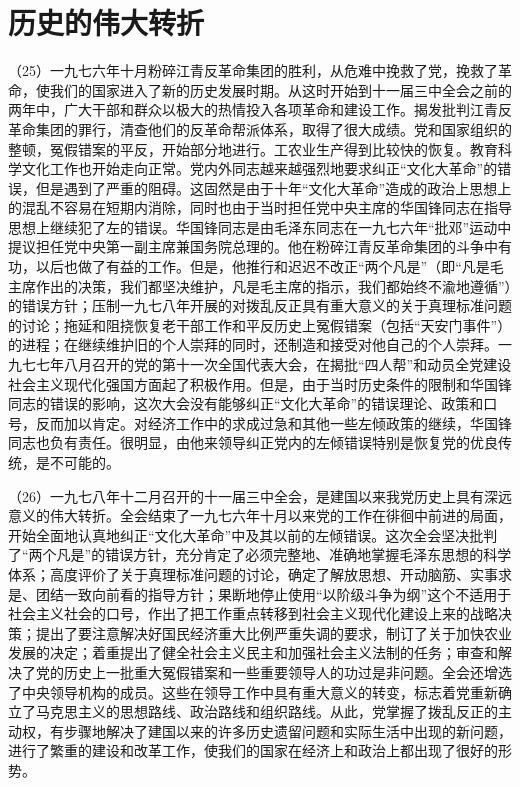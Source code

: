 \section{历史的伟大转折}

（25）一九七六年十月粉碎江青反革命集团的胜利，从危难中挽救了党，挽救了革命，使我们的国家进入了新的历史发展时期。从这时开始到十一届三中全会之前的两年中，广大干部和群众以极大的热情投入各项革命和建设工作。揭发批判江青反革命集团的罪行，清查他们的反革命帮派体系，取得了很大成绩。党和国家组织的整顿，冤假错案的平反，开始部分地进行。工农业生产得到比较快的恢复。教育科学文化工作也开始走向正常。党内外同志越来越强烈地要求纠正“文化大革命”的错误，但是遇到了严重的阻碍。这固然是由于十年“文化大革命”造成的政治上思想上的混乱不容易在短期内消除，同时也由于当时担任党中央主席的华国锋同志在指导思想上继续犯了左的错误。华国锋同志是由毛泽东同志在一九七六年“批邓”运动中提议担任党中央第一副主席兼国务院总理的。他在粉碎江青反革命集团的斗争中有功，以后也做了有益的工作。但是，他推行和迟迟不改正“两个凡是”（即“凡是毛主席作出的决策，我们都坚决维护，凡是毛主席的指示，我们都始终不渝地遵循”）的错误方针；压制一九七八年开展的对拨乱反正具有重大意义的关于真理标准问题的讨论；拖延和阻挠恢复老干部工作和平反历史上冤假错案（包括“天安门事件”）的进程；在继续维护旧的个人崇拜的同时，还制造和接受对他自己的个人崇拜。一九七七年八月召开的党的第十一次全国代表大会，在揭批“四人帮”和动员全党建设社会主义现代化强国方面起了积极作用。但是，由于当时历史条件的限制和华国锋同志的错误的影响，这次大会没有能够纠正“文化大革命”的错误理论、政策和口号，反而加以肯定。对经济工作中的求成过急和其他一些左倾政策的继续，华国锋同志也负有责任。很明显，由他来领导纠正党内的左倾错误特别是恢复党的优良传统，是不可能的。

（26）一九七八年十二月召开的十一届三中全会，是建国以来我党历史上具有深远意义的伟大转折。全会结束了一九七六年十月以来党的工作在徘徊中前进的局面，开始全面地认真地纠正“文化大革命”中及其以前的左倾错误。这次全会坚决批判了“两个凡是”的错误方针，充分肯定了必须完整地、准确地掌握毛泽东思想的科学体系；高度评价了关于真理标准问题的讨论，确定了解放思想、开动脑筋、实事求是、团结一致向前看的指导方针；果断地停止使用“以阶级斗争为纲”这个不适用于社会主义社会的口号，作出了把工作重点转移到社会主义现代化建设上来的战略决策；提出了要注意解决好国民经济重大比例严重失调的要求，制订了关于加快农业发展的决定；着重提出了健全社会主义民主和加强社会主义法制的任务；审查和解决了党的历史上一批重大冤假错案和一些重要领导人的功过是非问题。全会还增选了中央领导机构的成员。这些在领导工作中具有重大意义的转变，标志着党重新确立了马克思主义的思想路线、政治路线和组织路线。从此，党掌握了拨乱反正的主动权，有步骤地解决了建国以来的许多历史遗留问题和实际生活中出现的新问题，进行了繁重的建设和改革工作，使我们的国家在经济上和政治上都出现了很好的形势。

